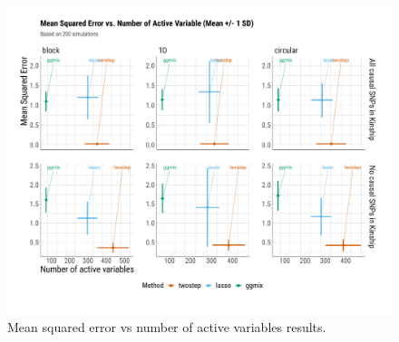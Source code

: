 \documentclass[12pt,letter]{article}\usepackage[]{graphicx}\usepackage[]{color}
\newenvironment{knitrout}{}{} %
\begin{document}
\begin{knitrout}\scriptsize
{}\color{fgcolor}\begin{figure}[H]

{\centering \includegraphics[width=1\linewidth]{figure/plot-mse-nactive-sim-1} 

}

\caption[Mean squared error vs number of active variables results]{Mean squared error vs number of active variables results.}\label{fig:plot-mse-nactive-sim}
\end{figure}


\end{knitrout}
\end{document}
